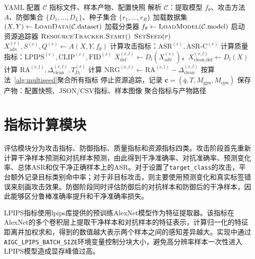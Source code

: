 \documentclass[type=bachelor,oneside]{fduthesis}
\begin{document}
\begin{algorithm}[H]
  \caption{单配置攻防评估流水线}
  \label{alg:eval_pipeline}
  \begin{algorithmic}[1]
    \Require YAML 配置 $\mathcal{C}$
    \Ensure 指标文件、样本产物、配置快照
    \State 解析 $\mathcal{C}$：提取模型 $f_\theta$、攻击方法 $A$、防御集合 $\{D_1,\ldots,D_L\}$、种子集合 $\{r_1,\ldots,r_R\}$
    \State 加载数据集 $(X, Y) \gets \textsc{LoadData}(\mathcal{C}.\text{dataset})$
    \State 加载分类器 $f_\theta \gets \textsc{LoadModel}(\mathcal{C}.\text{model})$
    \State 启动资源追踪器 $\textsc{ResourceTracker.Start}()$
      \State $\textsc{SetSeed}(r)$
      \State $X_{\text{adv}}^{(r)}, S^{(r)}, Q^{(r)} \gets A(X, Y, f_\theta)$ 
      \State 计算攻击指标：$\text{ASR}^{(r)}, \text{ASR-C}^{(r)}$
      \State 计算质量指标：$\text{LPIPS}^{(r)}, \text{CLIP}^{(r)}, \text{FID}^{(r)}$
        \State $X_{\text{def}}^{(r,l)} \gets D_l(X_{\text{adv}}^{(r)})$，$X_{\text{clean\_def}}^{(r,l)} \gets D_l(X)$
        \State 计算 $\text{RA}^{(r,l)}, \Delta_{\text{clean}}^{(r,l)}, T_{D_l}^{(r)}$
        \State 计算 $\text{NRG}^{(r,l)} \gets \text{RA}^{(r,l)} - \Delta_{\text{clean}}^{(r,l)}$
      \EndFor
    \EndFor
    \State 按算法~\ref{alg:multiseed}聚合所有指标
    \State 停止资源追踪，记录 $\mathbf{c} = (\bar{q}, T, M_{\text{gpu}}, M_{\text{cpu}})$
    \State 保存产物：配置快照、JSON/CSV指标、样本图像
    \State \Return 聚合指标与产物路径
  \end{algorithmic}
\end{algorithm}

\section{指标计算模块}

评估模块分为攻击指标、防御指标、质量指标和资源指标四类。攻击阶段首先重新计算干净样本预测和对抗样本预测，由此得到干净准确率、对抗准确率、预测变化率、总体ASR和仅干净正确样本上的ASR。对于设置了\texttt{target\_class}的攻击，平台额外记录目标类别命中率；对于非目标攻击，则主要使用预测变化和真实标签错误来刻画攻击效果。防御阶段同时评估防御后的对抗样本和防御后的干净样本，因此能够区分鲁棒准确率提升和干净准确率损失。

LPIPS指标使用lpips库提供的预训练AlexNet模型作为特征提取器。该指标在AlexNet的多个卷积层上提取干净样本和对抗样本的特征表示，计算归一化的特征距离并加权求和，得到的数值越大表示两个样本之间的感知差异越大。实现中通过\texttt{AIGC\_LPIPS\_BATCH\_SIZE}环境变量控制分块大小，避免高分辨率样本一次性进入LPIPS模型造成显存峰值过高。
\end{document}
